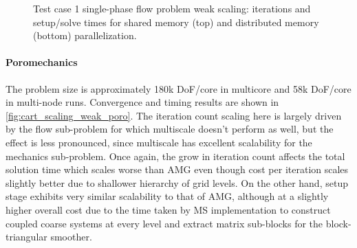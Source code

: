 \begin{figure} [htbp]
  \begin{subfigure}[t]{0.48\textwidth}
    \centering
    
  \end{subfigure}
  \hfill
   \begin{subfigure}[t]{0.48\textwidth}
    \centering
    
  \end{subfigure}
  \begin{subfigure}[t]{0.48\textwidth}
    \centering
    
  \end{subfigure}
  \hfill
  \begin{subfigure}[t]{0.48\textwidth}
    \centering
    
  \end{subfigure}
  \caption[Test case 1 single-phase flow problem weak scaling]{Test case 1 single-phase flow problem weak scaling: iterations and setup/solve times for shared memory (top) and distributed memory (bottom) parallelization.}
  \label{fig:cart_scaling_weak_flow}
\end{figure}

\paragraph{Poromechanics}
The problem size is approximately 180k DoF/core in multicore and 58k DoF/core in multi-node runs.   Convergence and timing results are shown in \cref{fig:cart_scaling_weak_poro}.   The iteration count scaling here is largely driven by the flow sub-problem for which multiscale doesn't perform as well, but the effect is less pronounced, since multiscale has excellent scalability for the mechanics sub-problem.   Once again, the grow in iteration count affects the total solution time which scales worse than AMG even though cost per iteration scales slightly better due to shallower hierarchy of grid levels.   On the other hand, setup stage exhibits very similar scalability to that of AMG, although at a slightly higher overall cost due to the time taken by MS implementation to construct coupled coarse systems at every level and extract matrix sub-blocks for the block-triangular smoother.

